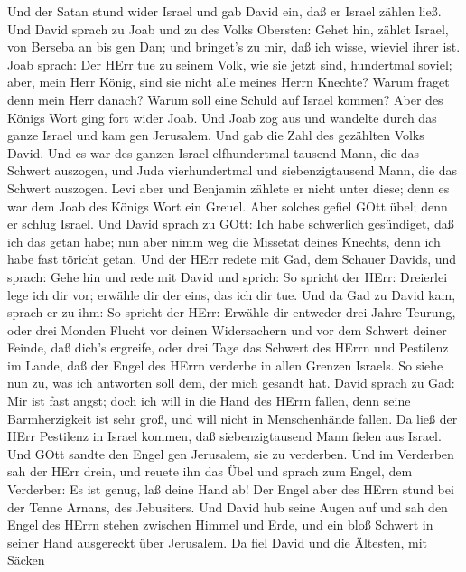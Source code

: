  Und der Satan stund wider Israel und gab David ein, daß er
Israel zählen ließ.  Und David sprach zu Joab und zu des
Volks Obersten: Gehet hin, zählet Israel, von Berseba an bis gen Dan;
und bringet's zu mir, daß ich wisse, wieviel ihrer ist. 
Joab sprach: Der HErr tue zu seinem Volk, wie sie jetzt sind, hundertmal
soviel; aber, mein Herr König, sind sie nicht alle meines Herrn Knechte?
Warum fraget denn mein Herr danach? Warum soll eine Schuld auf Israel
kommen?  Aber des Königs Wort ging fort wider Joab. Und Joab
zog aus und wandelte durch das ganze Israel und kam gen Jerusalem.
 Und gab die Zahl des gezählten Volks David. Und es war des
ganzen Israel elfhundertmal tausend Mann, die das Schwert auszogen, und
Juda vierhundertmal und siebenzigtausend Mann, die das Schwert auszogen.
 Levi aber und Benjamin zählete er nicht unter diese; denn
es war dem Joab des Königs Wort ein Greuel.  Aber solches
gefiel GOtt übel; denn er schlug Israel.  Und David sprach
zu GOtt: Ich habe schwerlich gesündiget, daß ich das getan habe; nun
aber nimm weg die Missetat deines Knechts, denn ich habe fast töricht
getan.  Und der HErr redete mit Gad, dem Schauer Davids, und
sprach:  Gehe hin und rede mit David und sprich: So spricht
der HErr: Dreierlei lege ich dir vor; erwähle dir der eins, das ich dir
tue.  Und da Gad zu David kam, sprach er zu ihm: So spricht
der HErr: Erwähle dir  entweder drei Jahre Teurung, oder
drei Monden Flucht vor deinen Widersachern und vor dem Schwert deiner
Feinde, daß dich's ergreife, oder drei Tage das Schwert des HErrn und
Pestilenz im Lande, daß der Engel des HErrn verderbe in allen Grenzen
Israels. So siehe nun zu, was ich antworten soll dem, der mich gesandt
hat.  David sprach zu Gad: Mir ist fast angst; doch ich
will in die Hand des HErrn fallen, denn seine Barmherzigkeit ist sehr
groß, und will nicht in Menschenhände fallen.  Da ließ der
HErr Pestilenz in Israel kommen, daß siebenzigtausend Mann fielen aus
Israel.  Und GOtt sandte den Engel gen Jerusalem, sie zu
verderben. Und im Verderben sah der HErr drein, und reuete ihn das Übel
und sprach zum Engel, dem Verderber: Es ist genug, laß deine Hand ab!
Der Engel aber des HErrn stund bei der Tenne Arnans, des Jebusiters.
 Und David hub seine Augen auf und sah den Engel des HErrn
stehen zwischen Himmel und Erde, und ein bloß Schwert in seiner Hand
ausgereckt über Jerusalem. Da fiel David und die Ältesten, mit Säcken

